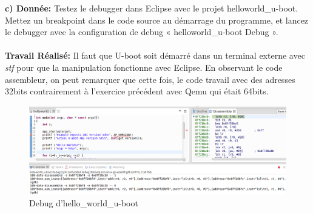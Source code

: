 \textbf{c) Donnée: } Testez le debugger dans Eclipse avec le projet helloworld\_u-boot. Mettez un breakpoint dans le
code source au démarrage du programme, et lancez le debugger avec la configuration de debug
« helloworld\_u-boot Debug ». \\\\
\textbf{Travail Réalisé: } Il faut que U-boot soit démarré dans un terminal externe avec \textit{stf} pour que la manipulation fonctionne avec Eclipse. En observant le code assembleur, on peut remarquer que cette fois, le code travail avec des adresses 32bits contrairement à l'exercice précédent avec Qemu qui était 64bits.
\begin{figure}[H]
	\begin{center}
		\includegraphics[width=18cm]{img/ubootCommand2.png}
		\caption{Debug d'hello\_world\_u-boot}
		\label{ubootComm2}
	\end{center}
\end{figure}

